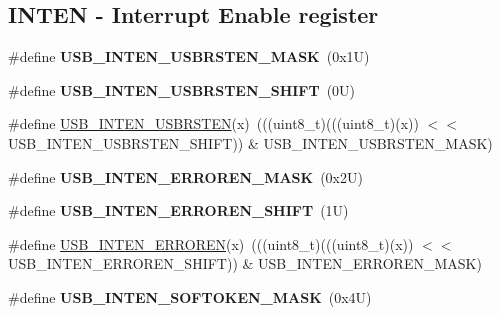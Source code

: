 \subsection*{I\+N\+T\+EN -\/ Interrupt Enable register}
\begin{DoxyCompactItemize}
\item 
\mbox{\label{group___u_s_b___register___masks_ga67ed1b19b1fe4e25fc5ccf7bf0d42c38}} 
\#define {\bfseries U\+S\+B\+\_\+\+I\+N\+T\+E\+N\+\_\+\+U\+S\+B\+R\+S\+T\+E\+N\+\_\+\+M\+A\+SK}~(0x1\+U)
\item 
\mbox{\label{group___u_s_b___register___masks_gaf3b53207fe24da42d123d8e94494b72f}} 
\#define {\bfseries U\+S\+B\+\_\+\+I\+N\+T\+E\+N\+\_\+\+U\+S\+B\+R\+S\+T\+E\+N\+\_\+\+S\+H\+I\+FT}~(0\+U)
\item 
\#define \mbox{\hyperlink{group___u_s_b___register___masks_ga9adae8276677c093c8b86f2198ae27bb}{U\+S\+B\+\_\+\+I\+N\+T\+E\+N\+\_\+\+U\+S\+B\+R\+S\+T\+EN}}(x)~(((uint8\+\_\+t)(((uint8\+\_\+t)(x)) $<$$<$ U\+S\+B\+\_\+\+I\+N\+T\+E\+N\+\_\+\+U\+S\+B\+R\+S\+T\+E\+N\+\_\+\+S\+H\+I\+FT)) \& U\+S\+B\+\_\+\+I\+N\+T\+E\+N\+\_\+\+U\+S\+B\+R\+S\+T\+E\+N\+\_\+\+M\+A\+SK)
\item 
\mbox{\label{group___u_s_b___register___masks_gaf660b76755baff6ed122be3eba21723b}} 
\#define {\bfseries U\+S\+B\+\_\+\+I\+N\+T\+E\+N\+\_\+\+E\+R\+R\+O\+R\+E\+N\+\_\+\+M\+A\+SK}~(0x2\+U)
\item 
\mbox{\label{group___u_s_b___register___masks_ga38c74121b3660065935c4f639f987b3c}} 
\#define {\bfseries U\+S\+B\+\_\+\+I\+N\+T\+E\+N\+\_\+\+E\+R\+R\+O\+R\+E\+N\+\_\+\+S\+H\+I\+FT}~(1\+U)
\item 
\#define \mbox{\hyperlink{group___u_s_b___register___masks_ga0d5944dbfdce653f192a20b6664ebcba}{U\+S\+B\+\_\+\+I\+N\+T\+E\+N\+\_\+\+E\+R\+R\+O\+R\+EN}}(x)~(((uint8\+\_\+t)(((uint8\+\_\+t)(x)) $<$$<$ U\+S\+B\+\_\+\+I\+N\+T\+E\+N\+\_\+\+E\+R\+R\+O\+R\+E\+N\+\_\+\+S\+H\+I\+FT)) \& U\+S\+B\+\_\+\+I\+N\+T\+E\+N\+\_\+\+E\+R\+R\+O\+R\+E\+N\+\_\+\+M\+A\+SK)
\item 
\mbox{\label{group___u_s_b___register___masks_ga6398aff7e3278bea66900a35b616563f}} 
\#define {\bfseries U\+S\+B\+\_\+\+I\+N\+T\+E\+N\+\_\+\+S\+O\+F\+T\+O\+K\+E\+N\+\_\+\+M\+A\+SK}~(0x4\+U)

\end{DoxyCompactItemize}
